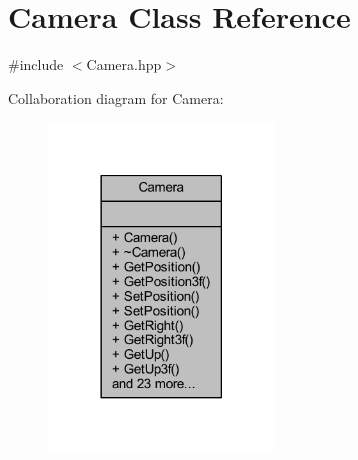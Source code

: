 \hypertarget{class_camera}{}\section{Camera Class Reference}
\label{class_camera}


{\ttfamily \#include $<$Camera.\+hpp$>$}



Collaboration diagram for Camera\+:\nopagebreak
\begin{figure}[H]
\begin{center}
\leavevmode
\includegraphics[width=170pt]{class_camera__coll__graph}
\end{center}
\end{figure}
